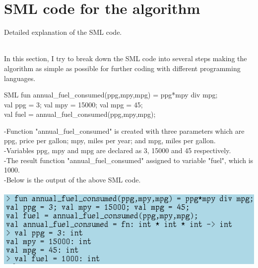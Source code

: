 \documentclass{article}
\begin{document}
\section*{SML code for the algorithm} 
\hypertarget{2}{Detailed explanation of the SML code.} \\
In this section, I try to break down the SML code into several steps making the algorithm as simple as possible for further coding with different programming languages. 
\begin{GFT}{SML}
\+fun annual\_fuel\_consumed(ppg,mpy,mpg) = ppg*mpy div mpg;\\
\+val ppg = 3; val mpy = 15000; val mpg = 45;\\
\+val fuel = annual\_fuel\_consumed(ppg,mpy,mpg);\\
\end{GFT}
-Function "annual_fuel_consumed" is created with three parameters which are ppg, price per gallon; mpy, miles per year; and mpg, miles per gallon. \\
-Variables ppg, mpy and mpg are declared as 3, 15000 and 45 respectively. \\
-The result function "annual_fuel_consumed" assigned to variable "fuel", which is 1000. \\
-Below is the output of the above SML code. \\
\smallskip \\
\includegraphics[scale =0.6]{fuelsml.png} \\
\noindent{\color{red}\rule{\linewidth}{0.5mm}}
\clearpage 
\end{document}
